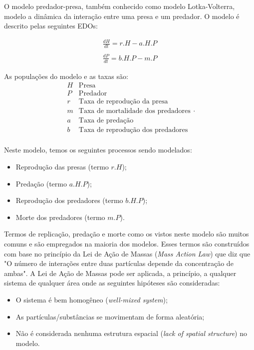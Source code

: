 \documentclass[
	12pt,				%
	openright,			%
	oneside,			%
	a4paper,			%
	main=brazil,
	english,			%
	]{ufsj-abntex2}
\begin{document}
O modelo predador-presa, também conhecido como modelo Lotka-Volterra, modelo a dinâmica da interação entre uma presa e um predador. O modelo é descrito pelas seguintes EDOs: 

\begin{equation}\label{eq:predadorpresa}
    \begin{array}{lr}
    \frac{dH}{dt} = r.H - a.H.P
    \\
    \\
    \frac{dP}{dt} = b.H.P - m.P
    \end{array}
\end{equation}

As populações do modelo e as taxas são: 
\[
    \begin{array}{lr}
    H & \text{Presa}\\
    P & \text{Predador}\\
    r & \text{Taxa de reprodução da presa}\\
    m & \text{Taxa de mortalidade dos predadores}\\
    a & \text{Taxa de predação}\\
    b & \text{Taxa de reprodução dos predadores}\\
    \end{array}.
\]

Neste modelo, temos os seguintes processos sendo modelados: 
\begin{itemize}
    \item Reprodução das presas (termo $r.H$);
    \item Predação (termo $a.H.P$);
    \item Reprodução dos predadores (termo $b.H.P$);
    \item Morte dos predadores (termo $m.P$). 
\end{itemize}

Termos de replicação, predação e morte como os vistos neste modelo são muitos comuns e são empregados na maioria dos modelos. Esses termos são construídos com base no princípio da Lei de Ação de Massas (\textit{Mass Action Law}) que diz que "O número de interações entre duas partículas depende da concentração de ambas". A Lei de Ação de Massas pode ser aplicada, a princípio, a qualquer sistema de qualquer área onde as seguintes hipóteses são consideradas: 
    \begin{itemize}
        \item O sistema é bem homogêneo (\textit{well-mixed system}); 
        \item As partículas/substâncias se movimentam de forma aleatória; 
        \item Não é considerada nenhuma estrutura espacial (\textit{lack of spatial structure}) no modelo.
    \end{itemize}
\end{document}

